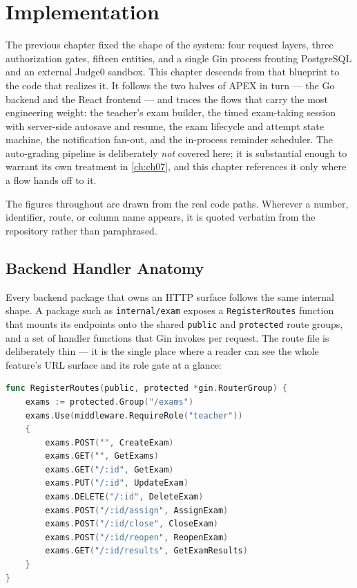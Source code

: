 \chapter{Implementation}\label{ch:ch06}

The previous chapter fixed the shape of the system: four request layers, three
authorization gates, fifteen entities, and a single Gin process fronting
PostgreSQL and an external Judge0 sandbox. This chapter descends from that
blueprint to the code that realizes it. It follows the two halves of APEX in
turn --- the Go backend and the React frontend --- and traces the flows that
carry the most engineering weight: the teacher's exam builder, the timed
exam-taking session with server-side autosave and resume, the exam lifecycle
and attempt state machine, the notification fan-out, and the in-process
reminder scheduler. The auto-grading pipeline is deliberately \emph{not} covered
here; it is substantial enough to warrant its own treatment in
\cref{ch:ch07}, and this chapter references it only where a flow hands off to
it.

The figures throughout are drawn from the real code paths. Wherever a number,
identifier, route, or column name appears, it is quoted verbatim from the
repository rather than paraphrased.

\section{Backend Handler Anatomy}

Every backend package that owns an HTTP surface follows the same internal
shape. A package such as \texttt{internal/exam} exposes a \texttt{RegisterRoutes}
function that mounts its endpoints onto the shared \texttt{public} and
\texttt{protected} route groups, and a set of handler functions that Gin
invokes per request. The route file is deliberately thin --- it is the single
place where a reader can see the whole feature's URL surface and its role gate
at a glance:

\begin{lstlisting}[language=Go,caption={The exam feature's route registration --- one place, one role gate.},label={lst:examroutes-reg}]
func RegisterRoutes(public, protected *gin.RouterGroup) {
    exams := protected.Group("/exams")
    exams.Use(middleware.RequireRole("teacher"))
    {
        exams.POST("", CreateExam)
        exams.GET("", GetExams)
        exams.GET("/:id", GetExam)
        exams.PUT("/:id", UpdateExam)
        exams.DELETE("/:id", DeleteExam)
        exams.POST("/:id/assign", AssignExam)
        exams.POST("/:id/close", CloseExam)
        exams.POST("/:id/reopen", ReopenExam)
        exams.GET("/:id/results", GetExamResults)
    }
}
\end{lstlisting}

